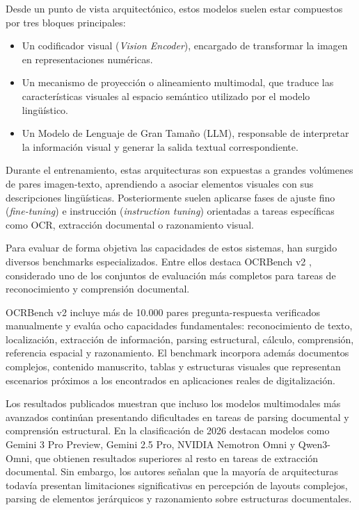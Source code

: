 Desde un punto de vista arquitectónico, estos modelos suelen estar compuestos por tres bloques principales:

\begin{itemize}
    \item Un codificador visual (\textit{Vision Encoder}), encargado de transformar la imagen en representaciones numéricas.

    \item Un mecanismo de proyección o alineamiento multimodal, que traduce las características visuales al espacio semántico utilizado por el modelo lingüístico.

    \item Un Modelo de Lenguaje de Gran Tamaño (LLM), responsable de interpretar la información visual y generar la salida textual correspondiente.

\end{itemize}

Durante el entrenamiento, estas arquitecturas son expuestas a grandes volúmenes de pares imagen-texto, aprendiendo a asociar elementos visuales con sus descripciones lingüísticas. Posteriormente suelen aplicarse fases de ajuste fino (\textit{fine-tuning}) e instrucción (\textit{instruction tuning}) orientadas a tareas específicas como OCR, extracción documental o razonamiento visual.

Para evaluar de forma objetiva las capacidades de estos sistemas, han surgido diversos benchmarks especializados. Entre ellos destaca OCRBench v2 \cite{fu2025ocrbenchv2}, considerado uno de los conjuntos de evaluación más completos para tareas de reconocimiento y comprensión documental.

OCRBench v2 incluye más de 10.000 pares pregunta-respuesta verificados manualmente y evalúa ocho capacidades fundamentales: reconocimiento de texto, localización, extracción de información, parsing estructural, cálculo, comprensión, referencia espacial y razonamiento. El benchmark incorpora además documentos complejos, contenido manuscrito, tablas y estructuras visuales que representan escenarios próximos a los encontrados en aplicaciones reales de digitalización.

Los resultados publicados muestran que incluso los modelos multimodales más avanzados continúan presentando dificultades en tareas de parsing documental y comprensión estructural. En la clasificación de 2026 destacan modelos como Gemini 3 Pro Preview, Gemini 2.5 Pro, NVIDIA Nemotron Omni y Qwen3-Omni, que obtienen resultados superiores al resto en tareas de extracción documental. Sin embargo, los autores señalan que la mayoría de arquitecturas todavía presentan limitaciones significativas en percepción de layouts complejos, parsing de elementos jerárquicos y razonamiento sobre estructuras documentales.

